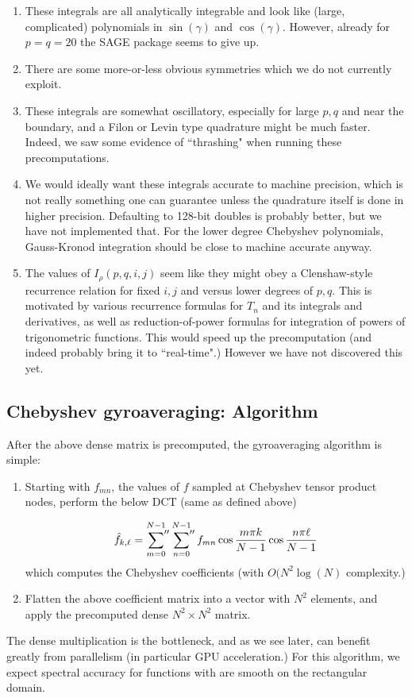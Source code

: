 \begin{enumerate}
	\item These integrals are all analytically integrable and look like (large, complicated) polynomials in $\sin(\gamma)$ and $\cos(\gamma)$.  However, already for $p=q=20$ the SAGE package seems to give up.
	\item There are some more-or-less obvious symmetries which we do not currently exploit.
	\item These integrals are somewhat oscillatory, especially for large $p,q$ and near the boundary, and a Filon or Levin type quadrature might be much faster.  Indeed, we saw some evidence of ``thrashing" when running these precomputations.
	\item We would ideally want these integrals accurate to machine precision, which is not really something one can guarantee unless the quadrature itself is done in higher precision.  Defaulting to 128-bit doubles is probably better, but we have not implemented that.  For the lower degree Chebyshev polynomials, Gauss-Kronod integration should be close to machine accurate anyway.
	\item The values of $I_{\rho}(p,q,i,j)$ seem like they might obey a Clenshaw-style recurrence relation for fixed $i,j$ and versus lower degrees of $p,q$.  This is motivated by various recurrence formulas for $T_n$ and its integrals and derivatives, as well as reduction-of-power formulas for integration of powers of trigonometric functions.  This would speed up the precomputation (and indeed probably bring it to ``real-time".)  However we have not discovered this yet.
\end{enumerate}

\subsection{Chebyshev gyroaveraging: Algorithm }
After the above dense matrix is precomputed, the gyroaveraging algorithm is simple:
\begin{enumerate}
	\item Starting with $f_{mn}$, the values of $f$ sampled at Chebyshev tensor product nodes, perform the below DCT (same as defined above) 
	
	\[ \hat{f}_{k,\ell} = \sideset{}{''}\sum_{m=0}^{N-1} \sideset{}{''}\sum_{n=0}^{N-1}f_{mn} \cos \frac{m \pi k}{N-1} \cos \frac{n \pi \ell}{N-1} \]
	which computes the Chebyshev coefficients (with $O(N^2 \log(N)$ complexity.)
	\item Flatten the above coefficient matrix into a vector with $N^2$ elements, and apply the precomputed dense $N^2 \times N^2$ matrix.
\end{enumerate}
 The dense multiplication is the bottleneck, and as we see later, can benefit greatly from parallelism (in particular GPU acceleration.)  For this algorithm, we expect spectral accuracy for functions with are smooth on the rectangular domain.

 